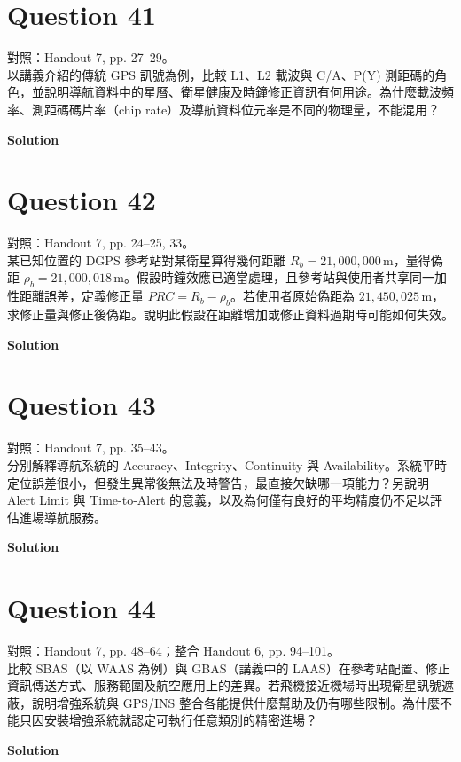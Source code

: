 \documentclass[12pt,a4paper]{article}
\newcommand{\question}[1]{\section*{Question #1}}
\newcommand{\solution}{\par\medskip\textbf{Solution}\par}
\begin{document}
\question{41}
{\small 對照：Handout 7, pp. 27--29。}\\
以講義介紹的傳統 GPS 訊號為例，比較 L1、L2 載波與 C/A、P(Y) 測距碼的角色，並說明導航資料中的星曆、衛星健康及時鐘修正資訊有何用途。為什麼載波頻率、測距碼碼片率（chip rate）及導航資料位元率是不同的物理量，不能混用？
\solution
\vfill
\question{42}
{\small 對照：Handout 7, pp. 24--25, 33。}\\
某已知位置的 DGPS 參考站對某衛星算得幾何距離 $R_b=21{,}000{,}000\,\mathrm{m}$，量得偽距 $\rho_b=21{,}000{,}018\,\mathrm{m}$。假設時鐘效應已適當處理，且參考站與使用者共享同一加性距離誤差，定義修正量 $PRC=R_b-\rho_b$。若使用者原始偽距為 $21{,}450{,}025\,\mathrm{m}$，求修正量與修正後偽距。說明此假設在距離增加或修正資料過期時可能如何失效。
\solution
\vfill
\newpage

\question{43}
{\small 對照：Handout 7, pp. 35--43。}\\
分別解釋導航系統的 Accuracy、Integrity、Continuity 與 Availability。系統平時定位誤差很小，但發生異常後無法及時警告，最直接欠缺哪一項能力？另說明 Alert Limit 與 Time-to-Alert 的意義，以及為何僅有良好的平均精度仍不足以評估進場導航服務。
\solution
\vfill
\question{44}
{\small 對照：Handout 7, pp. 48--64；整合 Handout 6, pp. 94--101。}\\
比較 SBAS（以 WAAS 為例）與 GBAS（講義中的 LAAS）在參考站配置、修正資訊傳送方式、服務範圍及航空應用上的差異。若飛機接近機場時出現衛星訊號遮蔽，說明增強系統與 GPS/INS 整合各能提供什麼幫助及仍有哪些限制。為什麼不能只因安裝增強系統就認定可執行任意類別的精密進場？
\solution
\vfill
\end{document}
